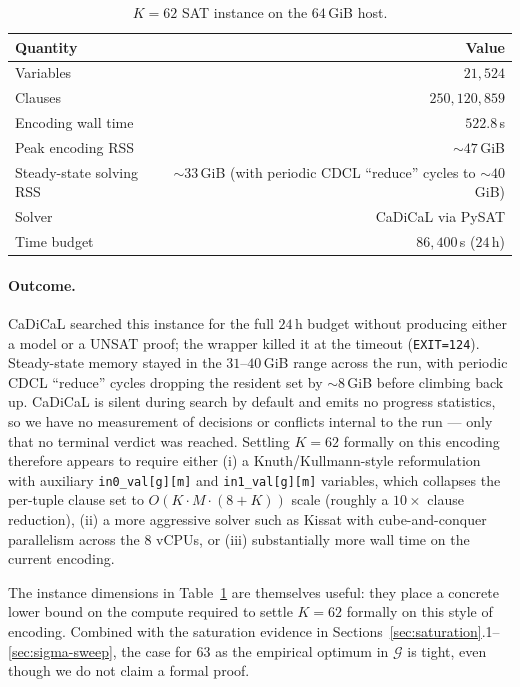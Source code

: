 \documentclass[11pt]{article}
\begin{document}
\begin{table}[h!]
  \centering
  \caption{$K{=}62$ SAT instance on the $64$\,GiB host.}
  \label{tab:k62-instance}
  \begin{tabular}{lr}
    \toprule
    Quantity & Value \\
    \midrule
    Variables  & $21{,}524$ \\
    Clauses    & $250{,}120{,}859$ \\
    Encoding wall time & $522.8$\,s \\
    Peak encoding RSS & $\sim$$47$\,GiB \\
    Steady-state solving RSS & $\sim$$33$\,GiB (with periodic CDCL ``reduce''
                                                cycles to $\sim$$40$\,GiB) \\
    Solver & CaDiCaL via PySAT \\
    Time budget & $86{,}400$\,s ($24$\,h) \\
    \bottomrule
  \end{tabular}
\end{table}

\paragraph{Outcome.}
CaDiCaL searched this instance for the full $24$\,h budget without
producing either a model or a UNSAT proof; the wrapper killed it at
the timeout (\texttt{EXIT=124}). Steady-state memory stayed in the
$31$--$40$\,GiB range across the run, with periodic CDCL ``reduce''
cycles dropping the resident set by $\sim$$8$\,GiB before climbing
back up. CaDiCaL is silent during search by default and emits no
progress statistics, so we have no measurement of decisions or
conflicts internal to the run --- only that no terminal verdict was
reached.
Settling $K{=}62$ formally on this encoding therefore appears to
require either (i) a Knuth/Kullmann-style reformulation with
auxiliary \texttt{in0\_val[g][m]} and \texttt{in1\_val[g][m]}
variables, which collapses the per-tuple clause set to
$O(K\cdot M\cdot(8+K))$ scale (roughly a $10\times$ clause reduction),
(ii) a more aggressive solver such as Kissat with cube-and-conquer
parallelism across the $8$ vCPUs, or (iii) substantially more wall
time on the current encoding.

The instance dimensions in Table~\ref{tab:k62-instance} are themselves
useful: they place a concrete lower bound on the compute required to
settle $K{=}62$ formally on this style of encoding. Combined with the
saturation evidence in Sections~\ref{sec:saturation}.1--\ref{sec:sigma-sweep},
the case for $63$ as the empirical optimum in $\mathcal{G}$ is tight,
even though we do not claim a formal proof.
\end{document}
